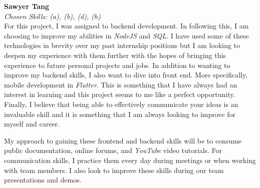\documentclass[12pt]{article}
\begin{document}
\begin{enumerate}
  \medskip
  \textbf{Sawyer Tang}\\
  \textit{Chosen Skills: (a), (b), (d), (h)} \\
  For this project, I was assigned to backend development. In following this, I am choosing to improve my abilities in \textit{NodeJS} and \textit{SQL}. I have used some of these technologies in brevity over my past internship positions but I am looking to deepen my experience with them further with the hopes of bringing this experience to future personal projects and jobs. 
  In addition to wanting to improve my backend skills, I also want to dive into front end. More specifically, mobile development in \textit{Flutter}. This is something that I have always had an interest in learning and this project seems to me like a perfect opportunity.
  Finally, I believe that being able to effectively communicate your ideas is an invaluable skill and it is something that I am always looking to improve for myself and career. \par
  My approach to gaining these frontend and backend skills will be to consume public documentation, online forums, and \textit{YouTube} video tutorials. For communication skills, I practice them every day during meetings or when working with team members. I also look to improve these skills during our team presentations and demos.


\end{enumerate}
\end{document}
